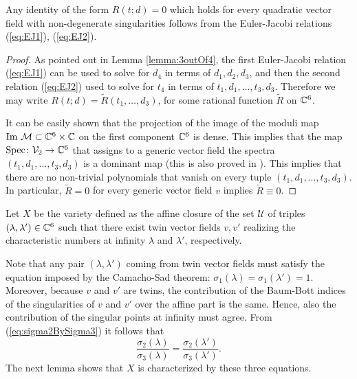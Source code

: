 \documentclass[phd,tocprelim]{cornell}
\begin{document}

\begin{lemma}\label{lemma:finiteSpectra}
 Any identity of the form $R(t;d)=0$ which holds for every quadratic vector field with non-degenerate singularities follows from the Euler-Jacobi relations (\ref{eq:EJ1}), (\ref{eq:EJ2}).
\end{lemma}

\begin{proof}
 As pointed out in Lemma \ref{lemma:3outOf4}, the first Euler-Jacobi relation (\ref{eq:EJ1}) can be used to solve for $d_4$ in terms of $d_1,d_2,d_3$, and then the second relation (\ref{eq:EJ2}) used to solve for $t_4$ in terms of $t_1,d_1,\ldots,t_3,d_3$. Therefore we may write $R(t;d)=\tilde{R}(t_1,\ldots,d_3)$, for some rational function $\tilde{R}$ on $\mathbb{C}^6$.
 
 It can be easily shown that the projection of the image of the moduli map $\operatorname{Im}\,\mathcal{M}\subset\mathbb{C}^6\times\mathbb{C}$ on the first component $\mathbb{C}^6$ is dense. This implies that the map $\operatorname{Spec}\colon\mathcal{V}_2\to\mathbb{C}^6$ that assigns to a generic vector field the spectra $(t_1,d_1,\ldots,t_3,d_3)$ is a dominant map (this is also proved in \cite{TwinVectorFields}). This implies that there are no non-trivial polynomials that vanish on every tuple $(t_1,d_1,\ldots,t_3,d_3)$. In particular, $\tilde{R}=0$ for every generic vector field $v$ implies $\tilde{R}\equiv 0$. 
\end{proof}

Let $X$ be the variety defined as the affine closure of the set $\mathcal{U}$ of triples $(\lambda,\lambda')\in\mathbb{C}^6$ such that there exist twin vector fields $v,v'$ realizing the characteristic numbers at infinity $\lambda$ and $\lambda'$, respectively.

Note that any pair $(\lambda,\lambda')$ coming from twin vector fields must satisfy the equation imposed by the Camacho-Sad theorem: $\sigma_1(\lambda)=\sigma_1(\lambda')=1$. Moreover, because $v$ and $v'$ are twins, the contribution of the Baum-Bott indices of the singularities of $v$ and $v'$ over the affine part is the same. Hence, also the contribution of the singular points at infinity must agree. From (\ref{eq:sigma2BySigma3}) it follows that
 \begin{equation}\label{eq:equalBB}
  \frac{\sigma_2(\lambda)}{\sigma_3(\lambda)} = \frac{\sigma_2(\lambda')}{\sigma_3(\lambda')} .
 \end{equation}
The next lemma shows that $X$ is characterized by these three equations.
\end{document}
